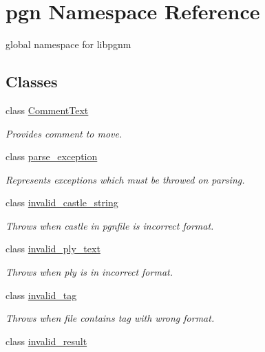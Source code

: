 \hypertarget{namespacepgn}{
\section{pgn Namespace Reference}
\label{namespacepgn}
}


global namespace for libpgnm  


\subsection*{Classes}
\begin{DoxyCompactItemize}
\item 
class \hyperlink{classpgn_1_1CommentText}{CommentText}
\begin{DoxyCompactList}\small\item\em Provides comment to move. \item\end{DoxyCompactList}\item 
class \hyperlink{classpgn_1_1parse__exception}{parse\_\-exception}
\begin{DoxyCompactList}\small\item\em Represents exceptions which must be throwed on parsing. \item\end{DoxyCompactList}\item 
class \hyperlink{classpgn_1_1invalid__castle__string}{invalid\_\-castle\_\-string}
\begin{DoxyCompactList}\small\item\em Throws when castle in pgnfile is incorrect format. \item\end{DoxyCompactList}\item 
class \hyperlink{classpgn_1_1invalid__ply__text}{invalid\_\-ply\_\-text}
\begin{DoxyCompactList}\small\item\em Throws when ply is in incorrect format. \item\end{DoxyCompactList}\item 
class \hyperlink{classpgn_1_1invalid__tag}{invalid\_\-tag}
\begin{DoxyCompactList}\small\item\em Throws when file contains tag with wrong format. \item\end{DoxyCompactList}\item 
class \hyperlink{classpgn_1_1invalid__result}{invalid\_\-result}

\end{DoxyCompactItemize}
